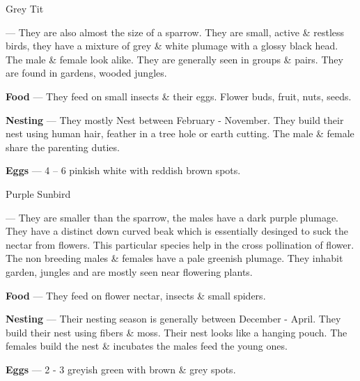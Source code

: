 \begin{bird}{Grey Tit}

 --- They are also almost the size of a sparrow. They are small, active \& restless birds, they have a mixture of grey \& white plumage with a glossy black head. The male \& female look alike. They are generally seen in groups \& pairs. They are found in gardens, wooded jungles. 

{\large\bf Food} --- They feed on small insects \& their eggs. Flower buds, fruit, nuts, seeds.

{\large\bf Nesting} --- They mostly Nest between February - November. They build their nest using human hair, feather in a tree hole or earth cutting. The male \& female share the parenting duties.

{\large\bf Eggs} --- 4 -- 6 pinkish white with reddish brown spots.
\end{bird}

\begin{bird}{Purple Sunbird}

 --- They are smaller than the sparrow, the males have a dark purple plumage. They have a distinct down curved beak which is essentially desinged to suck the nectar from flowers. This particular species help in the cross pollination of flower. The non breeding males \& females have a pale greenish plumage. They inhabit garden, jungles and are mostly seen near flowering plants.

{\large\bf Food} --- They feed on flower nectar, insects \& small spiders.

{\large\bf Nesting} --- Their nesting season is generally between December - April. They build their nest using fibers \& moss. Their nest looks like a hanging pouch. The females build the nest \& incubates the males feed the young ones.

{\large\bf Eggs} --- 2 - 3 greyish green with brown \& grey spots.
\end{bird}

